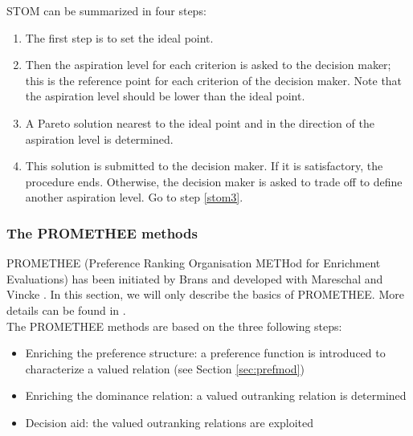 STOM can be summarized in four steps:
\begin{enumerate}
\item The first step is to set the ideal point.
\item Then the aspiration level for each criterion is asked to the decision maker; this is the reference point for each criterion of the decision maker. Note that the aspiration level should be lower than the ideal point.
\item \label{stom3} A Pareto solution nearest to the ideal point and in the direction of the aspiration level is determined.
\item This solution is submitted to the decision maker. If it is satisfactory, the procedure ends. Otherwise, the decision maker is asked to trade off to define another aspiration level. Go to step \ref{stom3}.
\end{enumerate}

\subsubsection{The PROMETHEE methods}
PROMETHEE (Preference Ranking Organisation METHod for Enrichment Evaluations) has been initiated by Brans \cite{Brans1} and developed with Mareschal \cite{mares2ejor88} and Vincke \cite{BransMarechalVincke84}. In this section, we will only describe the basics of PROMETHEE. More details can be found in \cite{Beh2010}.\\
The PROMETHEE methods are based on the three following steps:
\begin{itemize}
\item Enriching the preference structure: a preference function is introduced to characterize a valued relation (see Section \ref{sec:prefmod})
\item Enriching the dominance relation: a valued outranking relation is determined
\item Decision aid: the valued outranking relations are exploited
\end{itemize}

